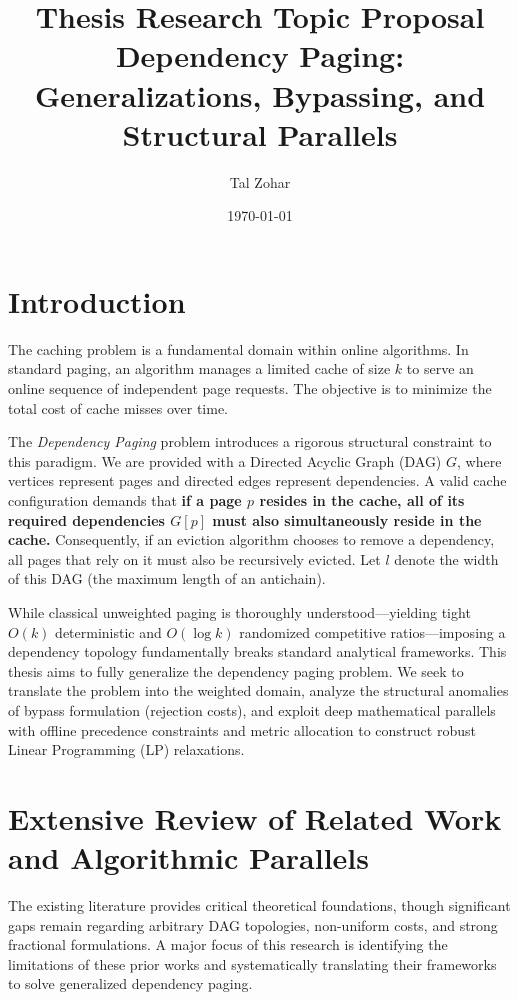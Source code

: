 \documentclass[a4paper,11pt]{article}
\title{\textbf{Thesis Research Topic Proposal}\\
\Large Dependency Paging: Generalizations, Bypassing, and Structural Parallels}
\author{Tal Zohar}
\date{\today}
\begin{document}
\maketitle
\tableofcontents
\newpage

\section{Introduction}

The caching problem is a fundamental domain within online algorithms. In standard paging, an algorithm manages a limited cache of size $k$ to serve an online sequence of independent page requests. The objective is to minimize the total cost of cache misses over time. 

The \textit{Dependency Paging} problem introduces a rigorous structural constraint to this paradigm. We are provided with a Directed Acyclic Graph (DAG) $G$, where vertices represent pages and directed edges represent dependencies. A valid cache configuration demands that \textbf{if a page $p$ resides in the cache, all of its required dependencies $G[p]$ must also simultaneously reside in the cache.} Consequently, if an eviction algorithm chooses to remove a dependency, all pages that rely on it must also be recursively evicted. Let $l$ denote the width of this DAG (the maximum length of an antichain).

While classical unweighted paging is thoroughly understood—yielding tight $O(k)$ deterministic and $O(\log k)$ randomized competitive ratios—imposing a dependency topology fundamentally breaks standard analytical frameworks. This thesis aims to fully generalize the dependency paging problem. We seek to translate the problem into the weighted domain, analyze the structural anomalies of bypass formulation (rejection costs), and exploit deep mathematical parallels with offline precedence constraints and metric allocation to construct robust Linear Programming (LP) relaxations.

\section{Extensive Review of Related Work and Algorithmic Parallels}

The existing literature provides critical theoretical foundations, though significant gaps remain regarding arbitrary DAG topologies, non-uniform costs, and strong fractional formulations. A major focus of this research is identifying the limitations of these prior works and systematically translating their frameworks to solve generalized dependency paging.
\end{document}
